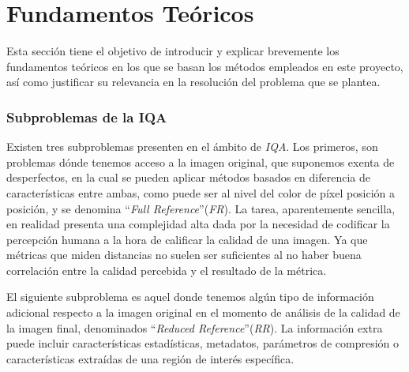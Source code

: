 \chapter{Fundamentos Teóricos}
Esta sección tiene el objetivo de introducir y explicar brevemente los
fundamentos teóricos en los que se basan los métodos empleados en este
proyecto, así como justificar su relevancia en la resolución del problema que
se plantea.

\subsection{Subproblemas de la IQA}
Existen tres subproblemas presenten en el ámbito de \emph{IQA}. Los primeros, son problemas 
dónde tenemos acceso a la imagen original, que suponemos exenta de desperfectos, 
en la cual se pueden aplicar métodos basados en diferencia de características 
entre ambas, como puede ser al nivel del color de píxel posición a posición,
y se denomina ``\emph{Full Reference}''(\emph{FR}). 
La tarea, aparentemente sencilla, en realidad presenta una complejidad alta dada por 
la necesidad de codificar la percepción humana a la hora de calificar la calidad 
de una imagen\cite{WhyIsIQASoDifficult}. Ya que métricas que miden distancias no suelen 
ser suficientes al no haber buena correlación entre la calidad percebida y el 
resultado de la métrica.


 
El siguiente subproblema es aquel donde tenemos algún tipo de información adicional respecto 
a la imagen original en el momento de análisis de la calidad de la imagen final,
denominados ``\emph{Reduced Reference}''(\emph{RR}). La información extra puede incluir características estadísticas, metadatos, parámetros 
de compresión o características extraídas de una región de interés específica.
 
